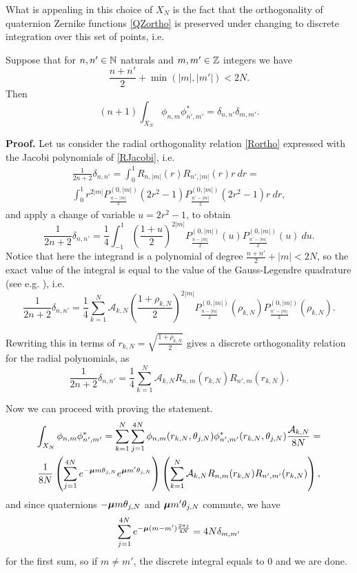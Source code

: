 What is appealing in this choice of $X_N$ is the fact that the orthogonality of quaternion Zernike functions \eqref{QZortho} is preserved under changing to  discrete integration over this set of points, i.e.
\begin{theorem}\label{QZdisc-ortho}
Suppose that for $n,n' \in \mathbb{N}$ naturals and $m,m' \in \mathbb{Z}$ integers we have $$\frac{n+n'}{2}+\min(|m|,|m'|) < 2N.$$ Then
\[
	(n+1) \int_{X_N} \phi_{n,m} \phi^*_{n',m'} =\delta_{n,n'}\delta_{m,m'}.
\]
\end{theorem}
\noindent\textbf{Proof.}
Let us consider the radial orthogonality relation \eqref{Rortho} expressed with the Jacobi polynomials of \eqref{RJacobi}, i.e.
\[
\begin{gathered}
	\frac{1}{2n+2} \delta_{n,n'} = \int_0^1 R_{n,|m|}(r) R_{n',|m|}(r)r\ dr  = \\
	\int_0^1 r^{2|m|} P_{\frac{n - |m|}{2}}^{(0,|m|)}(2r^2-1) P_{\frac{n' - |m|}{2}}^{(0,|m|)}(2r^2-1) r\ dr,
\end{gathered}
\]
and apply a change of variable $u=2r^2-1$, to obtain
\[
	\frac{1}{2n+2} \delta_{n,n'} = \frac{1}{4} \int_{-1}^1 \left(\frac{1+u}{2}\right)^{2|m|} P_{\frac{n - |m|}{2}}^{(0,|m|)}(u) P_{\frac{n' - |m|}{2}}^{(0,|m|)}(u)\ du.
\]
Notice that here the integrand is a polynomial of degree $\frac{n+n'}{2}+|m| < 2N$, so the exact value of the integral is equal to the value of the Gauss-Legendre quadrature (see e.g. \cite{Szego}), i.e.
\[
	\frac{1}{2n+2} \delta_{n,n'} = \frac{1}{4} \sum_{k=1}^{N} \mathcal{A}_{k,N} \left(\frac{1+\rho_{k,N}}{2}\right)^{2|m|} P_{\frac{n - |m|}{2}}^{(0,|m|)}(\rho_{k,N}) P_{\frac{n' - |m|}{2}}^{(0,|m|)}(\rho_{k,N}).
\]

Rewriting this in terms of $r_{k,N} = \sqrt{\frac{1+\rho_{k,N}}{2}}$ gives a discrete orthogonality relation for the radial polynomials, as
\begin{equation}\label{Rdisc-ortho}
	\frac{1}{2n+2} \delta_{n,n'} = \frac{1}{4} \sum_{k=1}^{N} \mathcal{A}_{k,N} R_{n,m}(r_{k,N}) R_{n',m}(r_{k,N}).
\end{equation}

Now we can proceed with proving the statement. 
\[
\begin{gathered}
	\int_{X_N} \phi_{n,m} \phi^*_{n',m'} = \sum_{k=1}^{N} \sum_{j=1}^{4N} \phi_{n,m}(r_{k,N},\theta_{j,N}) \phi^*_{n',m'}(r_{k,N},					\theta_{j,N}) \frac{\mathcal{A}_{k,N}}{8N} = \\
	\frac{1}{8N} \left( \sum_{j=1}^{4N} e^{-\boldsymbol{\mu} m\theta_{j,N}}e^{\boldsymbol{\mu} m' \theta_{j,N}} \right) \left( \sum_{k=1}^N \mathcal{A}_{k,N} R_{n,m}(r_{k,N}) R_{n',m'}(r_{k,N}) \right),
\end{gathered}
\]
and since quaternions $-\boldsymbol{\mu} m\theta_{j,N}$ and $\boldsymbol{\mu} m' \theta_{j,N}$ commute, we have
\[
	\sum_{j=1}^{4N} e^{-\boldsymbol{\mu} (m-m')\frac{2\pi j}{4N}} = 4N\delta_{m,m'}
\]
for the first sum, so if $m\neq m'$, the discrete integral equals to $0$ and we are done.

